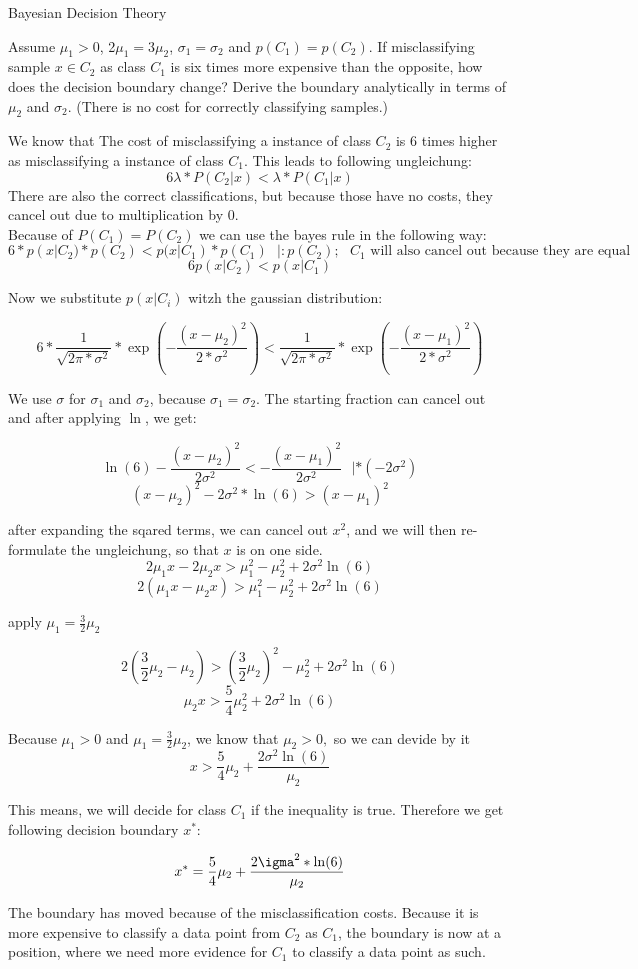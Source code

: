 \documentclass[
	english,
        solution=true
	]{tudaexercise}
\begin{document}
\begin{task}[points=4 + 8 + 8]{Bayesian Decision Theory}
\begin{subtask}[points=8,title=Different Misclassification Costs]
Assume $\mu_1 > 0$, 2$\mu_1 = 3\mu_2$, $\sigma_1=\sigma_2$ and $p(C_1) = p(C_2)$. If misclassifying sample $x \in C_2$ as class $C_1$ is six times more expensive than the opposite, how does the decision boundary change? Derive the boundary analytically in terms of $\mu_2$ and $\sigma_2$.
(There is no cost for correctly classifying samples.)
\begin{solution}
We know that The cost of misclassifying a instance of class $C_2$ is $6$ times higher as misclassifying a instance of class $C_1$. This leads to following ungleichung:
\[6\lambda*P(C_2|x)<\lambda*P(C_1|x)\]
There are also the correct classifications, but because those have no costs, they cancel out due to multiplication by 0.\\
Because of $P(C_1)=P(C_2)$ we can use the bayes rule in the following way:
\[6*p(x|C_2)*p(C_2)<p(x|C_1)*p(C_1) \,\,\,\, |:p(C_2); \text{ $C_1$ will also cancel out because they are equal}\]
\[6p(x|C_2)<p(x|C_1)\]

Now we substitute $p(x|C_i)$ witzh the gaussian distribution:

\[6*\frac{1}{\sqrt{2 \pi * \sigma^2}}*\exp (-\frac{(x-\mu_2)^2}{2*\sigma^2})<\frac{1}{\sqrt{2 \pi * \sigma^2}}*\exp (-\frac{(x-\mu_1)^2}{2*\sigma^2})\]

We use $\sigma$ for $\sigma_1$ and $\sigma_2$, because $\sigma_1=\sigma_2$. The starting fraction can cancel out and after applying $\ln$, we get:

\[\ln(6)-\frac{(x-\mu_2)^2}{2\sigma^2} <-\frac{(x-\mu_1)^2}{2\sigma^2} \,\,\,\, | * (-2\sigma^2)\]
\[(x-\mu_2)^2-2\sigma^2*\ln(6) > (x-\mu_1)^2\]

after expanding the sqared terms, we can cancel out $x^2$, and we will then re-formulate the ungleichung, so that $x$ is on one side.
\[2\mu_1x-2\mu_2x>\mu_1^2-\mu_2 ^2 + 2\sigma^2 \ln(6)\]
\[2(\mu_1x-\mu_2x)>\mu_1^2-\mu_2 ^2 + 2\sigma^2 \ln(6)\]

apply $\mu_1=\frac{3}{2}\mu_2$

\[2(\frac{3}{2}\mu_2-\mu_2)>(\frac{3}{2}\mu_2)^2-\mu^2_2 + 2\sigma^2\ln(6)\]
\[\mu_2x > \frac{5}{4}\mu^2_2+2\sigma^2\ln(6)\]

Because $\mu_1>0$ and $\mu_1=\frac{3}{2}\mu_2$, we know that $\mu_2>0, $ so we can devide by it
\[x > \frac{5}{4}\mu_2+\frac{2\sigma^2 \ln(6)}{\mu_2}\]

This means, we will decide for class $C_1$ if the inequality is true. Therefore we get following decision boundary $x^*$:

\[x^*=\frac{5}{4}\mu_2+\frac{2\igma^2*\ln(6)}{\mu_2}\]

The boundary has moved because of the misclassification costs. Because it is more expensive to classify a data point from $C_2$ as $C_1$, the boundary is now at a position, where we need more evidence for $C_1$ to classify a data point as such. 

\end{solution}
\end{subtask}
\end{task}
\end{document}
